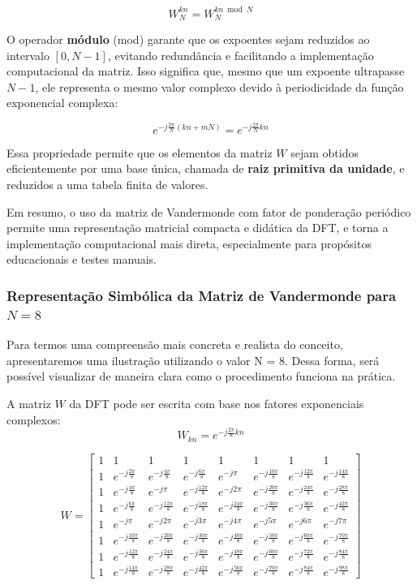 \documentclass[12pt]{article}
\begin{document}
\[
W_N^{kn} = W_N^{kn \bmod N}
\]

O operador \textbf{módulo} (mod) garante que os expoentes sejam reduzidos ao intervalo $[0, N-1]$, evitando redundância e facilitando a implementação computacional da matriz. Isso significa que, mesmo que um expoente ultrapasse $N-1$, ele representa o mesmo valor complexo devido à periodicidade da função exponencial complexa:

\[
e^{-j\frac{2\pi}{N}(kn + mN)} = e^{-j\frac{2\pi}{N}kn}
\]

Essa propriedade permite que os elementos da matriz $W$ sejam obtidos eficientemente por uma base única, chamada de \textbf{raiz primitiva da unidade}, e reduzidos a uma tabela finita de valores.

Em resumo, o uso da matriz de Vandermonde com fator de ponderação periódico permite uma representação matricial compacta e didática da DFT, e torna a implementação computacional mais direta, especialmente para propósitos educacionais e testes manuais.


\subsubsection{Representação Simbólica da Matriz de Vandermonde para $N = 8$}

Para termos uma compreensão mais concreta e realista do conceito, apresentaremos uma ilustração utilizando o valor N = 8. Dessa forma, será possível visualizar de maneira clara como o procedimento funciona na prática.

A matriz $W$ da DFT pode ser escrita com base nos fatores exponenciais complexos:
\[
W_{kn} = e^{-j\frac{2\pi}{8}kn}
\]

\[
W =
\begin{bmatrix}
1 & 1 & 1 & 1 & 1 & 1 & 1 & 1 \\
1 & e^{-j\frac{2\pi}{8}} & e^{-j\frac{4\pi}{8}} & e^{-j\frac{6\pi}{8}} & e^{-j\pi} & e^{-j\frac{10\pi}{8}} & e^{-j\frac{12\pi}{8}} & e^{-j\frac{14\pi}{8}} \\
1 & e^{-j\frac{4\pi}{8}} & e^{-j\pi} & e^{-j\frac{12\pi}{8}} & e^{-j2\pi} & e^{-j\frac{20\pi}{8}} & e^{-j\frac{24\pi}{8}} & e^{-j\frac{28\pi}{8}} \\
1 & e^{-j\frac{6\pi}{8}} & e^{-j\frac{12\pi}{8}} & e^{-j\frac{18\pi}{8}} & e^{-j\frac{24\pi}{8}} & e^{-j\frac{30\pi}{8}} & e^{-j\frac{36\pi}{8}} & e^{-j\frac{42\pi}{8}} \\
1 & e^{-j\pi} & e^{-j2\pi} & e^{-j3\pi} & e^{-j4\pi} & e^{-j5\pi} & e^{-j6\pi} & e^{-j7\pi} \\
1 & e^{-j\frac{10\pi}{8}} & e^{-j\frac{20\pi}{8}} & e^{-j\frac{30\pi}{8}} & e^{-j\frac{40\pi}{8}} & e^{-j\frac{50\pi}{8}} & e^{-j\frac{60\pi}{8}} & e^{-j\frac{70\pi}{8}} \\
1 & e^{-j\frac{12\pi}{8}} & e^{-j\frac{24\pi}{8}} & e^{-j\frac{36\pi}{8}} & e^{-j\frac{48\pi}{8}} & e^{-j\frac{60\pi}{8}} & e^{-j\frac{72\pi}{8}} & e^{-j\frac{84\pi}{8}} \\
1 & e^{-j\frac{14\pi}{8}} & e^{-j\frac{28\pi}{8}} & e^{-j\frac{42\pi}{8}} & e^{-j\frac{56\pi}{8}} & e^{-j\frac{70\pi}{8}} & e^{-j\frac{84\pi}{8}} & e^{-j\frac{98\pi}{8}}
\end{bmatrix}
\]
\end{document}
